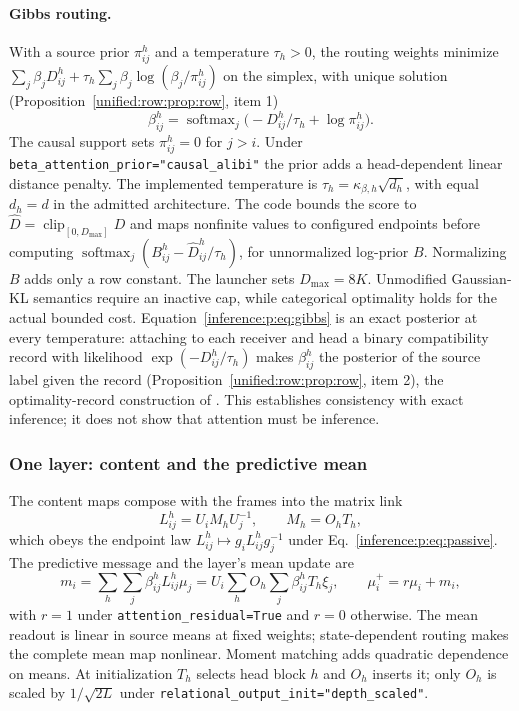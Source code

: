 \documentclass[11pt]{article}
\theoremstyle{definition}
\theoremstyle{remark}
\providecommand{\cfg}[1]{{\small\texttt{#1}}}
\providecommand{\softmax}{\operatorname{softmax}}
\begin{document}
\paragraph{Gibbs routing.}
With a source prior $\pi_{ij}^{h}$ and a temperature $\tau_h>0$, the routing weights minimize
$\sum_j\beta_jD_{ij}^{h}+\tau_h\sum_j\beta_j\log(\beta_j/\pi_{ij}^{h})$ on the simplex, with unique solution (Proposition~\ref{unified:row:prop:row}, item 1)
\begin{equation}
\beta_{ij}^{h}=\softmax_j\bigl(-D_{ij}^{h}/\tau_h+\log\pi_{ij}^{h}\bigr).
\label{inference:p:eq:gibbs}
\end{equation}
The causal support sets $\pi_{ij}^{h}=0$ for $j>i$. Under \cfg{beta\_attention\_prior="causal\_alibi"} the prior adds a head-dependent linear distance penalty. The implemented temperature is $\tau_h=\kappa_{\beta,h}\sqrt{d_h}$, with equal $d_h=d$ in the admitted architecture. The code bounds the score to $\widehat D=\operatorname{clip}_{[0,D_{\max}]}D$ and maps nonfinite values to configured endpoints before computing $\softmax_j(B_{ij}^h-\widehat D_{ij}^h/\tau_h)$, for unnormalized log-prior $B$. Normalizing $B$ adds only a row constant. The launcher sets $D_{\max}=8K$. Unmodified Gaussian-KL semantics require an inactive cap, while categorical optimality holds for the actual bounded cost. Equation~\eqref{inference:p:eq:gibbs} is an exact posterior at every temperature: attaching to each receiver and head a binary compatibility record with likelihood $\exp(-D_{ij}^{h}/\tau_h)$ makes $\beta_{ij}^{h}$ the posterior of the source label given the record (Proposition~\ref{unified:row:prop:row}, item 2), the optimality-record construction of \citep{unified:levine2018}. This establishes consistency with exact inference; it does not show that attention must be inference.

\subsubsection{One layer: content and the predictive mean}
\label{inference:p:sec:content}

The content maps compose with the frames into the matrix link
\begin{equation}
L_{ij}^{h}=U_iM_hU_j^{-1},\qquad M_h=O_hT_h,
\label{inference:p:eq:link}
\end{equation}
which obeys the endpoint law $L_{ij}^{h}\mapsto g_iL_{ij}^{h}g_j^{-1}$ under Eq.~\eqref{inference:p:eq:passive}. The predictive message and the layer's mean update are
\begin{equation}
m_i=\sum_h\sum_j\beta_{ij}^{h}L_{ij}^{h}\mu_j=U_i\sum_hO_h\sum_j\beta_{ij}^{h}T_h\xi_j,
\qquad
\mu_i^{+}=r\mu_i+m_i,
\label{inference:p:eq:mean}
\end{equation}
with $r=1$ under \cfg{attention\_residual=True} and $r=0$ otherwise. The mean readout is linear in source means at fixed weights; state-dependent routing makes the complete mean map nonlinear. Moment matching adds quadratic dependence on means. At initialization $T_h$ selects head block $h$ and $O_h$ inserts it; only $O_h$ is scaled by $1/\sqrt{2L}$ under \cfg{relational\_output\_init="depth\_scaled"}.
\end{document}
